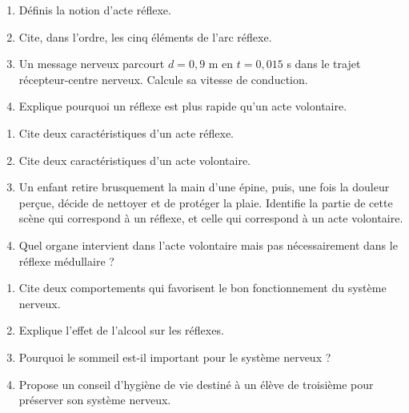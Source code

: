 \begin{enumerate}[label=\arabic*)]
\item Définis la notion d'acte réflexe.
\item Cite, dans l'ordre, les cinq éléments de l'arc réflexe.
\item Un message nerveux parcourt $d=0{,}9$ m en $t=0{,}015$ s dans le trajet
récepteur-centre nerveux. Calcule sa vitesse de conduction.
\item Explique pourquoi un réflexe est plus rapide qu'un acte volontaire.
\end{enumerate}

\begin{enumerate}[label=\arabic*)]
\item Cite deux caractéristiques d'un acte réflexe.
\item Cite deux caractéristiques d'un acte volontaire.
\item Un enfant retire brusquement la main d'une épine, puis, une fois la douleur perçue,
décide de nettoyer et de protéger la plaie. Identifie la partie de cette scène qui
correspond à un réflexe, et celle qui correspond à un acte volontaire.
\item Quel organe intervient dans l'acte volontaire mais pas nécessairement dans le
réflexe médullaire ?
\end{enumerate}

\begin{enumerate}[label=\arabic*)]
\item Cite deux comportements qui favorisent le bon fonctionnement du système nerveux.
\item Explique l'effet de l'alcool sur les réflexes.
\item Pourquoi le sommeil est-il important pour le système nerveux ?
\item Propose un conseil d'hygiène de vie destiné à un élève de troisième pour préserver
son système nerveux.
\end{enumerate}


